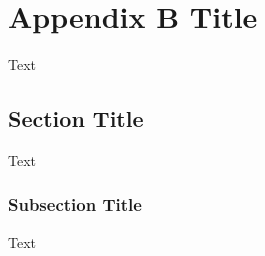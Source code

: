 \chapter{Appendix B Title}\label{appB}
Text

\section{Section Title}  %
Text

\subsection{Subsection Title} %
Text 